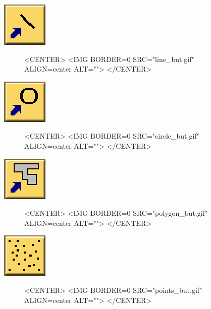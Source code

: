 \begin{ccTexOnly}
\mbox{\includegraphics{line_but.eps}}
\end{ccTexOnly}
\begin{figure}
\begin{ccHtmlOnly}
<CENTER>
<IMG BORDER=0 SRC="line_but.gif"  ALIGN=center  ALT="">
</CENTER>
\end{ccHtmlOnly}
\end{figure}

\begin{ccTexOnly}
\mbox{\includegraphics{circle_but.eps}}
\end{ccTexOnly}
\begin{figure}
\begin{ccHtmlOnly}
<CENTER>
<IMG BORDER=0 SRC="circle_but.gif"  ALIGN=center  ALT="">
</CENTER>
\end{ccHtmlOnly}
\end{figure}

\begin{ccTexOnly}
\mbox{\includegraphics{polygon_but.eps}}
\end{ccTexOnly}
\begin{figure}
\begin{ccHtmlOnly}
<CENTER>
<IMG BORDER=0 SRC="polygon_but.gif"  ALIGN=center  ALT="">
</CENTER>
\end{ccHtmlOnly}
\end{figure}

\begin{ccTexOnly}
\mbox{\includegraphics{points_but.eps}}
\end{ccTexOnly}
\begin{figure}
\begin{ccHtmlOnly}
<CENTER>
<IMG BORDER=0 SRC="points_but.gif"  ALIGN=center  ALT="">
</CENTER>
\end{ccHtmlOnly}
\end{figure}

